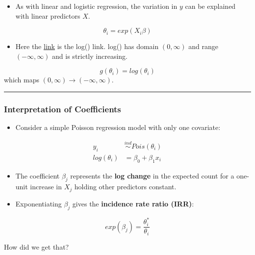 \documentclass[
  letterpaper,
  DIV=11,
  numbers=noendperiod]{scrreprt}
\providecommand{\tightlist}{%
  \setlength{\itemsep}{0pt}\setlength{\parskip}{0pt}}\usepackage{longtable,booktabs,array}
\begin{document}
\begin{itemize}
\tightlist
\item
  As with linear and logistic regression, the variation in \(y\) can be
  explained with linear predictors \(X\).
\end{itemize}

\[
\theta_i = exp(X_i \beta)
\]

\begin{itemize}
\tightlist
\item
  Here the \ul{link} is the log() link. log() has domain \((0, \infty)\)
  and range \((-\infty, \infty)\) and is strictly increasing.
\end{itemize}

\[
g(\theta_i) = log(\theta_i)
\] which maps \((0, \infty) \to (-\infty, \infty)\).

\begin{center}\rule{0.5\linewidth}{0.5pt}\end{center}

\hypertarget{interpretation-of-coefficients}{%
\subsubsection*{Interpretation of
Coefficients}\label{interpretation-of-coefficients}}

\begin{itemize}
\tightlist
\item
  Consider a simple Poisson regression model with only one covariate:
\end{itemize}

\[
\begin{align*}
y_i &\overset{ind}{\sim} Pois(\theta_i)\\
log(\theta_i) & = \beta_0 + \beta_1 x_i
\end{align*}
\]

\begin{itemize}
\item
  The coefficient \(\beta_j\) represents the \textbf{log change} in the
  expected count for a one-unit increase in \(X_j\) holding other
  predictors constant.
\item
  Exponentiating \(\beta_j\) gives the \textbf{incidence rate ratio
  (IRR)}:
\end{itemize}

\[
exp(\beta_j) = \frac{\theta_i^*}{\theta_i}
\]

How did we get that?
\end{document}
